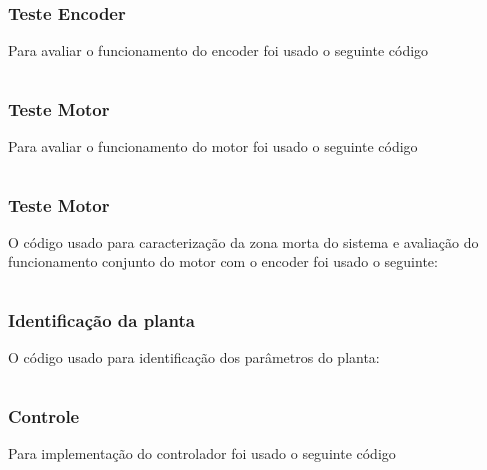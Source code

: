 \documentclass[a4paper,11pt]{article}
\begin{document}
\subsubsection*{Teste Encoder}
Para avaliar o funcionamento do encoder foi usado o seguinte código
\inputminted[xleftmargin=15pt,linenos,frame=single,framesep=5pt,breaklines=true]{c++}{../arduino/test_enconder/test_enconder.ino}

\newpage
\subsubsection*{Teste Motor}
Para avaliar o funcionamento do motor foi usado o seguinte código
\inputminted[xleftmargin=15pt,linenos,frame=single,framesep=5pt,breaklines=true]{c++}{../arduino/test_dcmotor/test_dcmotor.ino}

\newpage
\subsubsection*{Teste Motor}
O código usado para caracterização da zona morta do sistema e avaliação do funcionamento conjunto do motor com o encoder foi usado o seguinte:
\inputminted[xleftmargin=15pt,linenos,frame=single,framesep=5pt,breaklines=true]{c++}{../arduino/test_dcmotor_characterization/test_dcmotor_characterization.ino}

\newpage
\subsubsection*{Identificação da planta}
O código usado para identificação dos parâmetros do planta:
\inputminted[xleftmargin=15pt,linenos,frame=single,framesep=5pt,breaklines=true]{c++}{../arduino/test_dcmotor_pulses/test_dcmotor_pulses.ino}


\newpage
\subsubsection*{Controle}
Para implementação do controlador foi usado o seguinte código
\inputminted[xleftmargin=15pt,linenos,frame=single,framesep=5pt,breaklines=true]{c++}{../arduino/pid_control_plant/pid_control_plant.ino}

\end{document}
